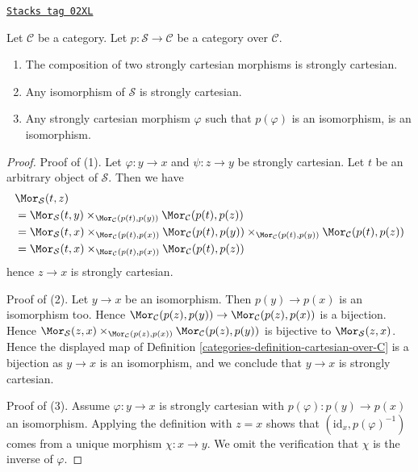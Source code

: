 \begin{lemma}
\label{categories-lemma-composition-cartesian}
\href{https://stacks.math.columbia.edu/tag/02XL}{\texttt{Stacks tag 02XL}}

Let $\mathcal{C}$ be a category.
Let $p : \mathcal{S} \to \mathcal{C}$ be a category over $\mathcal{C}$.
\begin{enumerate}
\item The composition of two strongly cartesian morphisms
is strongly cartesian.
\item Any isomorphism of $\mathcal{S}$ is strongly cartesian.
\item Any strongly cartesian morphism $\varphi$ such that $p(\varphi)$
is an isomorphism, is an isomorphism.
\end{enumerate}
\end{lemma}

\begin{proof}

Proof of (1). Let $\varphi : y \to x$ and $\psi : z \to y$ be
strongly cartesian. Let $t$ be an arbitrary object of $\mathcal{S}$.
Then we have
\begin{align*}
& \Mor_\mathcal{S}(t, z) \\
& =
\Mor_\mathcal{S}(t, y)
\times_{\Mor_\mathcal{C}(p(t), p(y))}
\Mor_\mathcal{C}(p(t), p(z)) \\
& =
\Mor_\mathcal{S}(t, x)
\times_{\Mor_\mathcal{C}(p(t), p(x))}
\Mor_\mathcal{C}(p(t), p(y))
\times_{\Mor_\mathcal{C}(p(t), p(y))}
\Mor_\mathcal{C}(p(t), p(z)) \\
& =
\Mor_\mathcal{S}(t, x)
\times_{\Mor_\mathcal{C}(p(t), p(x))}
\Mor_\mathcal{C}(p(t), p(z))
\end{align*}
hence $z \to x$ is strongly cartesian.

\medskip\noindent
Proof of (2). Let $y \to x$ be an isomorphism. Then $p(y) \to p(x)$
is an isomorphism too. Hence
$\Mor_\mathcal{C}(p(z), p(y)) \to
\Mor_\mathcal{C}(p(z), p(x))$
is a bijection. Hence
$\Mor_\mathcal{S}(z, x)
\times_{\Mor_\mathcal{C}(p(z), p(x))}
\Mor_\mathcal{C}(p(z), p(y))$ is bijective to
$\Mor_\mathcal{S}(z, x)$.
Hence the displayed map of
Definition \ref{categories-definition-cartesian-over-C}
is a bijection as $y \to x$ is an isomorphism, and we conclude that
$y \to x$ is strongly cartesian.

\medskip\noindent
Proof of (3). Assume $\varphi : y \to x$ is strongly cartesian with
$p(\varphi) : p(y) \to p(x)$ an isomorphism. Applying the definition with
$z = x$ shows that $(\text{id}_x, p(\varphi)^{-1})$ comes from a unique
morphism $\chi : x \to y$. We omit the verification that $\chi$ is the
inverse of $\varphi$.
\end{proof}

